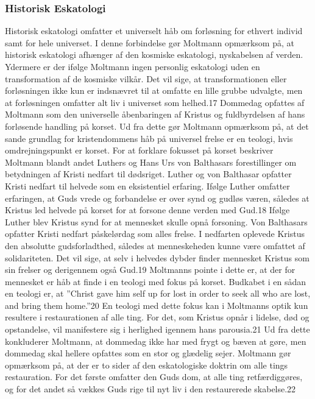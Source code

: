 \subsubsection{Historisk Eskatologi} 
Historisk eskatologi omfatter et universelt håb om forløsning for ethvert individ samt for hele universet. I denne forbindelse gør Moltmann opmærksom på, at historisk eskatologi afhænger af den kosmiske eskatologi, nyskabelsen af verden. Ydermere er der ifølge Moltmann ingen personlig eskatologi uden en transformation af de kosmiske vilkår. Det vil sige, at transformationen eller forløsningen ikke kun er indsnævret til at omfatte en lille grubbe udvalgte, men at forløsningen omfatter alt liv i universet som helhed.17 Dommedag opfattes af Moltmann som den universelle åbenbaringen af Kristus og fuldbyrdelsen af hans forløsende handling på korset. Ud fra dette gør Moltmann opmærksom på, at det sande grundlag for kristendommens håb på universel frelse er en teologi, hvis omdrejningspunkt er korset. For at forklare fokusset på korset beskriver Moltmann blandt andet Luthers og Hans Urs von Balthasars forestillinger om betydningen af Kristi nedfart til dødsriget. Luther og von Balthasar opfatter Kristi nedfart til helvede som en eksistentiel erfaring. Ifølge Luther omfatter erfaringen, at Guds vrede og forbandelse er over synd og gudløs væren, således at Kristus led helvede på korset for at forsone denne verden med Gud.18 Ifølge Luther blev Kristus synd for at mennesket skulle opnå forsoning. Von Balthasars opfatter Kristi nedfart påskelørdag som alles frelse. I nedfarten oplevede Kristus den absolutte gudsforladthed, således at menneskeheden kunne være omfattet af solidariteten. Det vil sige, at selv i helvedes dybder finder mennesket Kristus som sin frelser og derigennem også Gud.19 Moltmanns pointe i dette er, at der for mennesket er håb at finde i en teologi med fokus på korset. Budkabet i en sådan en teologi er, at ”Christ gave him self up for lost in order to seek all who are lost, and bring them home.”20 En teologi med dette fokus kan i Moltmanns optik kun resultere i restaurationen af alle ting. For det, som Kristus opnår i lidelse, død og opstandelse, vil manifestere sig i herlighed igennem hans parousia.21 Ud fra dette konkluderer Moltmann, at dommedag ikke har med frygt og bæven at gøre, men dommedag skal hellere opfattes som en stor og glædelig sejer. Moltmann gør opmærksom på, at der er to sider af den eskatologiske doktrin om alle tings restauration. For det første omfatter den Guds dom, at alle ting retfærdiggøres, og for det andet så vækkes Guds rige til nyt liv i den restaurerede skabelse.22